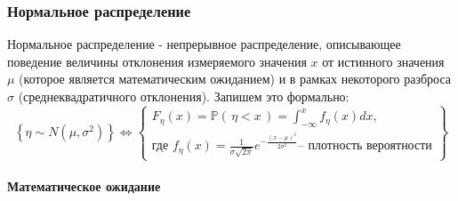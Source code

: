 \documentclass[
  russian,
  a4paper,
]{article}
\let\oldparagraph\paragraph
\renewcommand{\paragraph}[1]{\oldparagraph{#1}\mbox{}}
\begin{document}
\hypertarget{ux43dux43eux440ux43cux430ux43bux44cux43dux43eux435-ux440ux430ux441ux43fux440ux435ux434ux435ux43bux435ux43dux438ux435}{%
\subsubsection{Нормальное
распределение}\label{ux43dux43eux440ux43cux430ux43bux44cux43dux43eux435-ux440ux430ux441ux43fux440ux435ux434ux435ux43bux435ux43dux438ux435}}

Нормальное распределение - непрерывное распределение, описывающее
поведение величины отклонения измеряемого значения \(x\) от истинного
значения \(\mu\) (которое является математическим ожиданием) и в рамках
некоторого разброса \(\sigma\) (среднеквадратичного отклонения). Запишем
это формально:
\begin{equation}\left\{ \eta \sim N(\mu, \sigma^2) \right\}
\iff
\left\{\begin{gathered}
    F_\eta(x) = \mathbb{P}\left(\, \eta < x \,\right) = \int_{-\infty}^{x} f_\eta(x)dx,\\
    \text{где } f_\eta(x) = \frac{1}{\sigma\sqrt{2\pi}}e^{-\frac{(x-\mu)^2}{2\sigma^2}} \text{– плотность вероятности}
\end{gathered}\right\}\label{eq:norm_def}\end{equation}

\hypertarget{ux43cux430ux442ux435ux43cux430ux442ux438ux447ux435ux441ux43aux43eux435-ux43eux436ux438ux434ux430ux43dux438ux435-1}{%
\paragraph{Математическое
ожидание}\label{ux43cux430ux442ux435ux43cux430ux442ux438ux447ux435ux441ux43aux43eux435-ux43eux436ux438ux434ux430ux43dux438ux435-1}}
\end{document}
